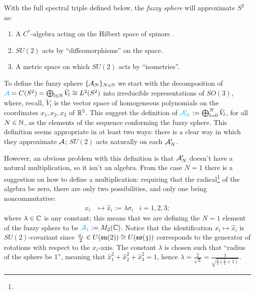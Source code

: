 With the full spectral triple defined below, the \textit{fuzzy sphere} will approximate $S^2$ as:
    
    \begin{enumerate}
    
    \item A $C^*$-algebra acting on the Hilbert space of spinors .
    
    \item $SU(2)$ acts by ``diffeomorphisms'' on the space.
    
    \item A metric space on which $SU(2)$ acts by ``isometries''.
    
    \end{enumerate}

\lin 

To define the fuzzy sphere $\{\mathcal A_N\}_{N \in \mathbb{N}}$ we start with the decomposition of $\textcolor{cyan}{\mathcal A} = C(S^2) =  \bigoplus_{l \in \mathbb{N}} \tilde V_l \cong L^2(S^2)$  into irreducible representations of $SO(3)$, where, recall, $\tilde V_l$ is the vector space of homogeneous polynomials on the coordinates $x_1, x_2, x_3$ of $\mathbb{R}^3$. This suggest the definition of $\textcolor{cyan}{\mathcal A'_N} := \bigoplus_{l = 0}^N \tilde V_l$, for all $N \in \mathbb{N}$, as the elements of the sequence conforming the fuzzy sphere. This definition seems appropriate in at least two ways: there is a clear way in which they approximate $\mathcal A$; $SU(2)$ acts naturally on each $\mathcal A_N'$.

However, an obvious problem with this definition is that $\mathcal A_N'$ doesn't have a natural multiplication, so it isn't an algebra. From the case $N = 1$ there is a suggestion on how to define a multiplication\cite{Madore}: requiring that the radical\footnote{} of the algebra be zero, there are only two possibilities, and only one being noncommutative:
\begin{align}
    x_i &\mapsto \hat x_i := \lambda \sigma_i & i = 1, 2, 3;
\end{align}
where $\lambda\in \mathbb{C}$ is any constant; this means that we are defining the $N = 1$ element of the fuzzy sphere to be $\textcolor{cyan}{\mathcal A_1} := M_2(\mathbb{C})$. Notice that the identification $x_i \mapsto \hat x_i$ is $SU(2)$-covariant since $\frac{\sigma_i}{2} \in U(\mathfrak{su}(2)) \cong U(\mathfrak{so(3)})$ corresponds to the generator of rotations with respect to the $x_i$-axis. The constant $\lambda$ is chosen such that ``radius of the sphere be $1$'', meaning that $\hat x_1^2 + \hat x_2^2 + \hat x_3^2 = 1$, hence $\lambda = \frac{2}{\sqrt{3}} = \frac{1}{\sqrt{\frac{1}{2} (\frac{1}{2} + 1)}}$.

